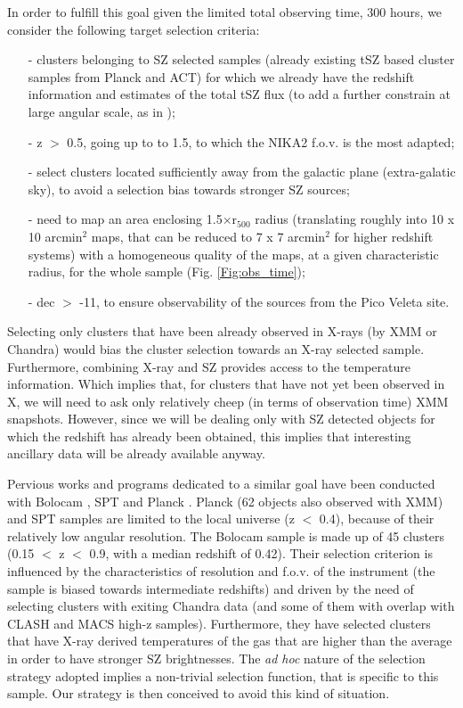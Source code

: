 \documentclass[11pt,a4paper,twoside,graphicx,color]{article}
\begin{document}
In order to fulfill this goal given the limited total observing time, 300 hours, we consider the following target selection criteria:
\begin{itemize}
  \item [-] clusters belonging to SZ selected samples (already existing tSZ based cluster samples from Planck and ACT) for which we already have the redshift information and estimates of the total tSZ flux (to add a further constrain at large angular scale, as in \citealt{Adam2015});
  \item [-] z $>$ 0.5, going up to to 1.5, to which the NIKA2 f.o.v. is the most adapted;
  \item [-] select clusters located sufficiently away from the galactic plane (extra-galatic sky), to avoid a selection bias towards stronger SZ sources;
  \item [-] need to map an area enclosing 1.5$\times$r$_{500}$ radius (translating roughly into 10 x 10 arcmin$^{2}$ maps, that can be reduced to 7 x 7 arcmin$^{2}$ for higher redshift systems) with a homogeneous quality of the maps, at a given characteristic radius, for the whole sample (Fig. \ref{Fig:obs_time});
  \item [-] dec $>$ -11, to ensure observability of the sources from the Pico Veleta site.
\end{itemize}

Selecting only clusters that have been already observed in X-rays (by XMM or Chandra) would bias the cluster selection towards an X-ray selected sample. Furthermore, combining X-ray and SZ provides access to the temperature information. Which implies that, for clusters that have not yet been observed in X, we will need to ask only relatively cheep (in terms of observation time) XMM snapshots. However, since we will be dealing only with SZ detected objects for which the redshift has already been obtained, this implies that interesting ancillary data will be already available anyway.

Pervious works and programs dedicated to a similar goal have been conducted with Bolocam \citep{Sayers2013, Czakon2014}, SPT \citep{Plagge2010} and Planck \citep{PPP}. Planck (62 objects also observed with XMM) and SPT samples are limited to the local universe (z $<$ 0.4), because of their relatively low angular resolution. The Bolocam sample is made up of 45 clusters (0.15 $<$ z $<$ 0.9, with a median redshift of 0.42). Their selection criterion is influenced by the characteristics of resolution and f.o.v. of the instrument (the sample is biased towards intermediate redshifts) and driven by the need of selecting clusters with exiting Chandra data (and some of them with overlap with CLASH and MACS high-z samples). Furthermore, they have selected clusters that have X-ray derived temperatures of the gas that are higher than the average in order to have stronger SZ brightnesses. The {\it ad hoc} nature of the selection strategy adopted implies a non-trivial selection function, that is specific to this sample. Our strategy is then conceived to avoid this kind of situation.
\end{document}
